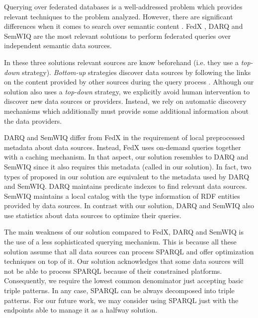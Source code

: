 \bigskip


Querying over federated databases is a well-addressed problem which provides relevant techniques to the problem analyzed.
However, there are significant differences when it comes to search over semantic content \citep{gorlitz_federated_2011}. %
FedX \citep{schwarte_fedx_federation2011,schwarte_fedx_optimization_2011}, DARQ \citep{quilitz_querying_2008} and SemWIQ \citep{langegger_semantic_2008} are the most relevant solutions to perform federated queries over independent semantic data sources.


In these three solutions relevant sources are know beforehand (i.e. they use a \emph{top-down} strategy).
\emph{Bottom-up} strategies discover data sources by following the links on the content provided by other sources during the query process \citep{schwarte_fedx_optimization_2011}.
Although our solution also uses a \emph{top-down} strategy, we explicitly avoid human intervention to discover new data sources or providers. %
Instead, we rely on automatic discovery mechanisms which additionally must provide some additional information about the data providers. %


DARQ and SemWIQ differ from FedX in the requirement of local preprocessed metadata about data sources.
Instead, FedX uses on-demand queries together with a caching mechanism. %
In that aspect, our solution resembles to DARQ and SemWIQ since it also requires this metadata (called \clues{} in our solution).
In fact, two types of \clues{} proposed in our solution are equivalent to the metadata used by DARQ and SemWIQ.
DARQ maintains predicate indexes to find relevant data sources.
SemWIQ maintains a local catalog with the type information of RDF entities provided by data sources. %
In contrast with our solution, DARQ and SemWIQ also use statistics about data sources to optimize their queries.


The main weakness of our solution compared to FedX, DARQ and SemWIQ is the use of a less sophisticated querying mechanism.
This is because all these solution assume that all data sources can process SPARQL and offer optimization techniques on top of it. %
Our solution acknowledges that some data sources will not be able to process SPARQL because of their constrained platforms.
Consequently, we require the lowest common denominator just accepting basic triple patterns.
In any case, SPARQL can be always decomposed into triple patterns.
For our future work, we may consider using SPARQL just with the endpoints able to manage it as a halfway solution.


